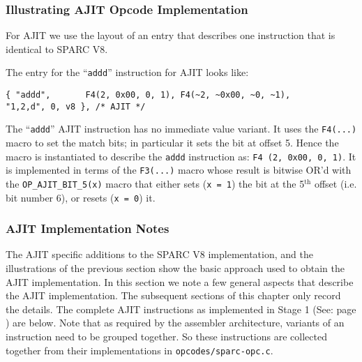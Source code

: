 \subsubsection{Illustrating AJIT Opcode Implementation}
\label{sec:ajit:opcode:implementation}

For AJIT we use the layout  of an entry that describes one instruction
that is identical to SPARC V8.

The entry for  the ``\texttt{addd}'' instruction for  AJIT looks like:
{\small
\begin{verbatim}
{ "addd",       F4(2, 0x00, 0, 1), F4(~2, ~0x00, ~0, ~1),       "1,2,d", 0, v8 }, /* AJIT */
\end{verbatim}
}

The ``\texttt{addd}'' AJIT instruction has no immediate value variant.
It  uses  the  \texttt{F4(...)}   macro  to set  the  match  bits;  in
particular  it  sets  the  bit  at  offset  5.   Hence  the  macro  is
instantiated to describe the  \texttt{addd} instruction as: \texttt{F4
  (2,   0x00,  0,   1)}.   It   is   implemented  in   terms  of   the
\texttt{F3(...)}   macro  whose  result   is  bitwise  OR'd  with  the
\texttt{OP\_AJIT\_BIT\_5(x)} macro  that either sets (\texttt{x  = 1})
the bit at the 5$^{\mathrm{th}}$ offset (i.e. bit number 6), or resets
(\texttt{x = 0}) it.

\subsubsection{AJIT Implementation Notes}
\label{sec:ajit:implementation:notes}

The AJIT  specific additions to  the SPARC V8 implementation,  and the
illustrations of the previous section  show the basic approach used to
obtain the AJIT implementation.  In this section we note a few general
aspects  that  describe  the   AJIT  implementation.   The  subsequent
sections of this  chapter only record the details.   The complete AJIT
instructions as  implemented in Stage 1  (See: page \pageref{stage:1})
are  below.  Note  that  as required  by  the assembler  architecture,
variants  of an  instruction need  to be  grouped together.   So these
instructions  are collected  together  from  their implementations  in
\texttt{opcodes/sparc-opc.c}.

